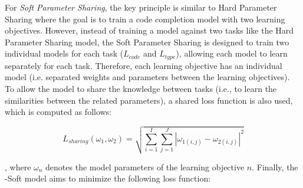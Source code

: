  


For \emph{Soft Parameter Sharing}, the key principle is similar to Hard Parameter Sharing where the goal is to train a code completion model with two learning objectives.
However, instead of training a model against two tasks like the Hard Parameter Sharing model, the Soft Parameter Sharing is designed to train two individual models for each task ($L_{code}$ and $L_{type}$), allowing each model to learn separately for each task.
Therefore, each learning objective has an individual model (i.e. separated weights and parameters between the learning objectives).
To allow the model to share the knowledge between tasks (i.e., to learn the similarities between the related parameters), a shared loss function is also used, which is computed as follows:

\begin{equation}
    \label{eq:norm}
    L_{sharing}(\omega_1, \omega_2) = 
    \sqrt{\sum_{i=1}^{I}\sum_{j=1}^{J}|\omega_{1(i,j)}-\omega_{2(i,j)}|^2}
\end{equation}




\noindent , where $\omega_n$ denotes the model parameters of the  learning objective $n$. Finally, the \our-Soft model aims to minimize the following loss function:

